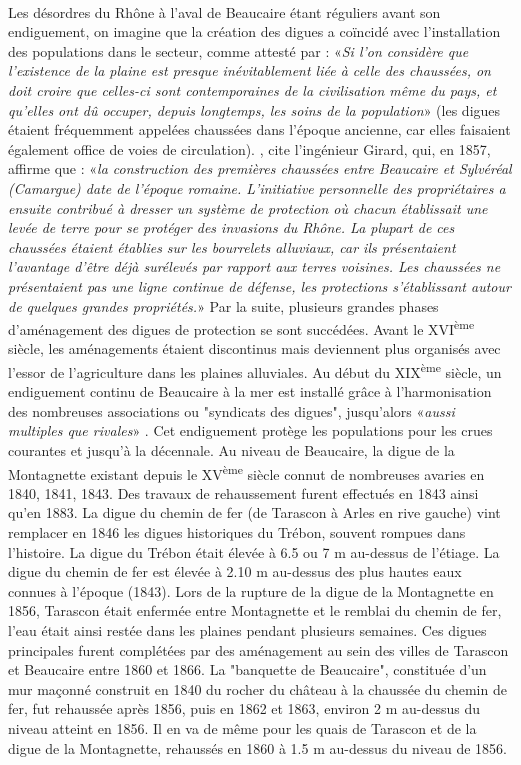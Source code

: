 		\paragraph{} Les désordres du Rhône à l'aval de Beaucaire étant réguliers avant son endiguement, on imagine que la création des digues a coïncidé avec l'installation des populations dans le secteur, comme attesté par \citet{surell_memoire_1847} : «\textit{Si l'on considère que l'existence de la plaine est presque inévitablement liée à celle des chaussées, on doit croire que celles-ci sont contemporaines de la civilisation même du pays, et qu'elles ont dû occuper, depuis longtemps, les soins de la population}» (les digues étaient fréquemment appelées chaussées dans l'époque ancienne, car elles faisaient également office de voies de circulation). \citet{mejean_etude_2017}, cite l'ingénieur Girard, qui, en 1857, affirme que : «\textit{la construction des premières chaussées entre Beaucaire et Sylvéréal (Camargue) date de l'époque romaine. L'initiative personnelle des propriétaires a ensuite contribué à dresser un système de protection où chacun établissait une levée de terre pour se protéger des invasions du Rhône. La plupart de ces chaussées étaient établies sur les bourrelets alluviaux, car ils présentaient l'avantage d'être déjà surélevés par rapport aux terres voisines. Les chaussées ne présentaient pas une ligne continue de défense, les protections s'établissant autour de quelques grandes propriétés.}» Par la suite, plusieurs grandes phases d'aménagement des digues de protection se sont succédées. Avant le XVI\textsuperscript{ème} siècle, les aménagements étaient discontinus mais deviennent plus organisés avec l'essor de l'agriculture dans les plaines alluviales. Au début du XIX\textsuperscript{ème} siècle, un endiguement continu de Beaucaire à la mer est installé grâce à l'harmonisation des nombreuses associations ou "syndicats des digues", jusqu'alors «\textit{aussi multiples que rivales}» \citep{pichard_sept_2014}. Cet endiguement protège les populations pour les crues courantes et jusqu'à la décennale. Au niveau de Beaucaire, la digue de la Montagnette existant depuis le XV\textsuperscript{ème} siècle connut de nombreuses avaries en 1840, 1841, 1843. Des travaux de rehaussement furent effectués en 1843 ainsi qu'en 1883. La digue du chemin de fer (de Tarascon à Arles en rive gauche) vint remplacer en 1846 les digues historiques du Trébon, souvent rompues dans l'histoire. La digue du Trébon était élevée à 6.5 ou 7 m au-dessus de l'étiage. La digue du chemin de fer est élevée à 2.10 m au-dessus des plus hautes eaux connues à l'époque (1843). Lors de la rupture de la digue de la Montagnette en 1856, Tarascon était enfermée entre Montagnette et le remblai du chemin de fer, l'eau était ainsi restée dans les plaines pendant plusieurs semaines. Ces digues principales furent complétées par des aménagement au sein des villes de Tarascon et Beaucaire entre 1860 et 1866. La "banquette de Beaucaire", constituée d'un mur maçonné construit en 1840 du rocher du château à la chaussée du chemin de fer, fut rehaussée après 1856, puis en 1862 et 1863, environ 2 m au-dessus du niveau atteint en 1856. Il en va de même pour les quais de Tarascon et de la digue de la Montagnette, rehaussés en 1860 à 1.5 m au-dessus du niveau de 1856.
		
